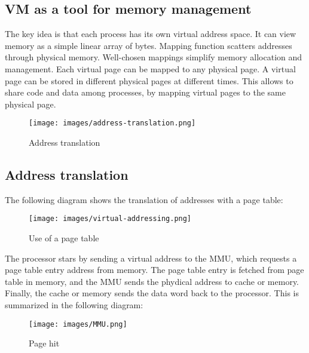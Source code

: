 \documentclass[toc]{../cs-classes/cs-classes}
\begin{document}
\subsection{VM as a tool for memory management}
The key idea is that each process has its own virtual address space. It can view memory as a simple linear array of bytes. Mapping function scatters addresses through physical memory. Well-chosen mappings simplify memory allocation and management. Each virtual page can be mapped to any physical page. A virtual page can be stored in different physical pages at different times. This allows to share code and data among processes, by mapping virtual pages to the same physical page.

\begin{figure}[!ht]
    \centering
    \texttt{[image: images/address-translation.png]}
    \caption{Address translation}
\end{figure}

\subsection{Address translation}
The following diagram shows the translation of addresses with a page table:
\begin{figure}[H]
    \centering
    \texttt{[image: images/virtual-addressing.png]}
    \caption{Use of a page table}
\end{figure}

The processor stars by sending a virtual address to the MMU, which requests a page table entry address from memory. The page table entry is fetched from page table in memory, and the MMU sends the phydical address to cache or memory. Finally, the cache or memory sends the data word back to the processor. This is summarized in the following diagram:
\begin{figure}[H]
    \centering
    \texttt{[image: images/MMU.png]}
    \caption{Page hit}
\end{figure}
\end{document}
